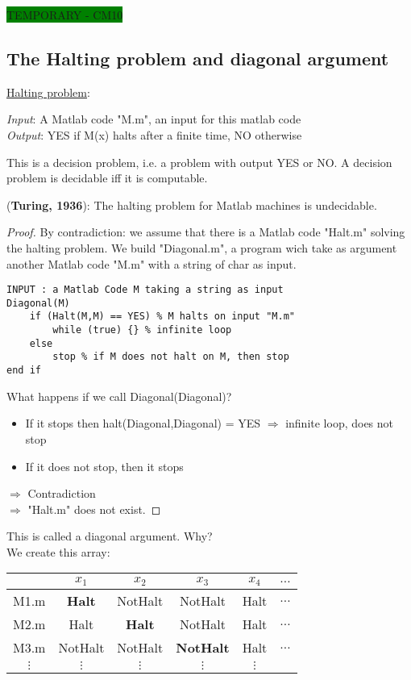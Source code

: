 \colorbox{green}{TEMPORARY - CM10}

\subsection{The Halting problem and diagonal argument}
\underline{Halting problem}:\\
\begin{leftbar}
\textit{Input}: A Matlab code "M.m", an input for this matlab code\\
\textit{Output}: YES if M(x) halts after a finite time, NO otherwise
\end{leftbar}

This is a decision problem, i.e. a problem with output YES or NO. A decision problem is decidable iff it is computable.\\

\begin{theorem}(\textbf{Turing, 1936}): The halting problem for Matlab machines is undecidable.
\end{theorem}
\begin{proof} By contradiction: we assume that there is a Matlab code "Halt.m" solving the halting problem. We build "Diagonal.m", a program wich take as argument another Matlab code "M.m" with a string of char as input.

\begin{lstlisting}[label={list:c3:select},caption={Diagonal(M)}]
INPUT : a Matlab Code M taking a string as input
Diagonal(M)
    if (Halt(M,M) == YES) % M halts on input "M.m"
        while (true) {} % infinite loop
    else
        stop % if M does not halt on M, then stop
end if
\end{lstlisting}

What happens if we call Diagonal(Diagonal)?
\begin{itemize}
\item If it stops then halt(Diagonal,Diagonal) = YES $\Rightarrow$ infinite loop, does not stop
\item If it does not stop, then it stops
\end{itemize}
$\Rightarrow$ Contradiction\\
$\Rightarrow$ "Halt.m" does not exist.
\end{proof}

This is called a diagonal argument. Why?\\
We create this array:
\begin{tabular}{c|ccccc}
	& $x_1$ & $x_2$ & $x_3$ & $x_4$ & $\hdots$ \\
  \hline
 	M1.m & \textbf{Halt} & NotHalt & NotHalt & Halt & $\hdots$  \\
 	M2.m & Halt & \textbf{Halt} & NotHalt & Halt & $\hdots$  \\
 	M3.m & NotHalt & NotHalt & \textbf{NotHalt} & Halt & $\hdots$  \\
 	$\vdots$ & $\vdots$ & $\vdots$ & $\vdots$ & $\vdots$ &  \\
\end{tabular}

